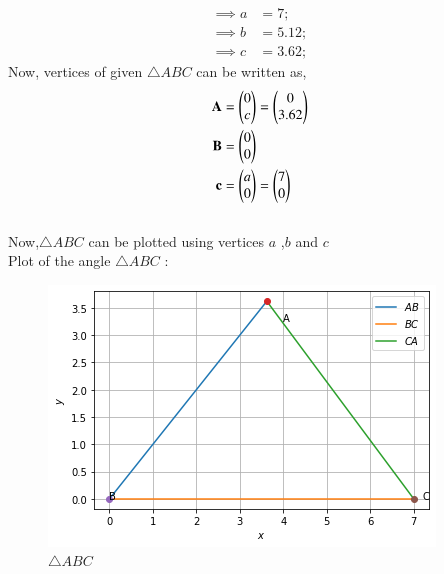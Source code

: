 \documentclass[journal,12pt,twocolumn]{IEEEtran}
\begin{document}
\begin{align}
    \implies a &=7;
    \\
    \implies b &=5.12;
    \\
    \implies c &=3.62;
 \end{align}
Now, vertices of given $\triangle ABC$ can be written as,
\begin{align}
\mathbf{A} &=\begin{pmatrix}0\\c\end{pmatrix}=\begin{pmatrix}0\\3.62\end{pmatrix}
\\
\mathbf{B} &=\begin{pmatrix}0\\0\end{pmatrix}
\\
\mathbf{c} &=\begin{pmatrix}a\\0\end{pmatrix}=\begin{pmatrix}7\\0\end{pmatrix}
\end{align}
\\
Now,$\triangle ABC$ can be plotted using vertices $a$ ,$b$ and $c$
\\
Plot of the angle $\triangle ABC$ :
\begin{figure}[!ht]
\centering
\includegraphics[width=\columnwidth]{figure.png}
\caption{$\triangle ABC$}
\label{fig:$\triangle ABC$}
\end{figure}    
\end{document}
